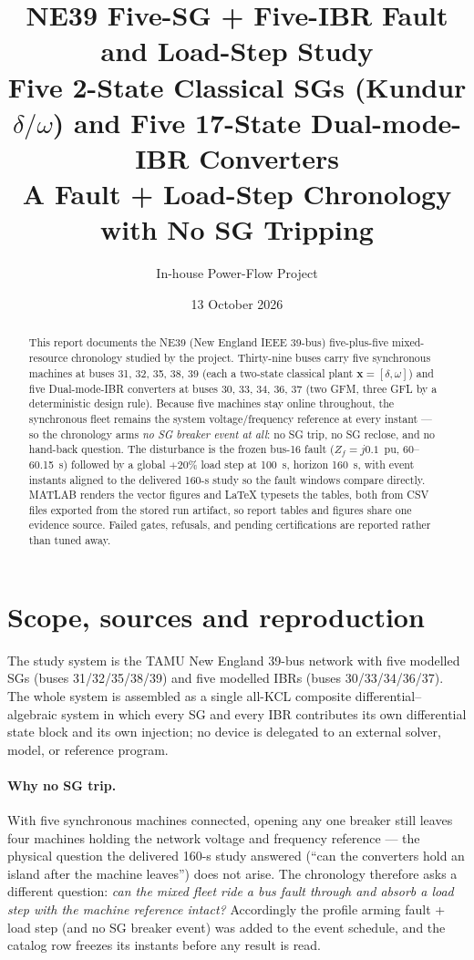 \documentclass[12pt,a4paper]{article}
\title{\textbf{NE39 Five-SG + Five-IBR Fault and Load-Step Study}\\
\large Five 2-State Classical SGs (Kundur $\delta/\omega$) and Five 17-State Dual-mode-IBR Converters\\[1mm]
\normalsize A Fault + Load-Step Chronology with No SG Tripping}
\author{In-house Power-Flow Project}
\date{13 October 2026}
\newcommand{\vect}[1]{\boldsymbol{#1}}
\newcommand{\code}[1]{\texttt{\detokenize{#1}}}
\begin{document}
\maketitle

\begin{abstract}
This report documents the NE39 (New England IEEE 39-bus) five-plus-five mixed-resource
chronology studied by the project.  Thirty-nine buses carry five synchronous machines
at buses 31, 32, 35, 38, 39 (each a two-state classical plant $\vect x=[\delta,\omega]$)
and five Dual-mode-IBR converters at buses 30, 33, 34, 36, 37 (two GFM, three GFL by a
deterministic design rule).
Because five machines stay online throughout, the synchronous fleet remains the
system voltage/frequency reference at every instant --- so the chronology arms
\emph{no SG breaker event at all}: no SG trip, no SG reclose, and no hand-back
question.  The disturbance is the frozen bus-16 fault ($Z_f=j0.1$~pu,
60--60.15~s) followed by a global $+20\%$ load step at 100~s, horizon 160~s, with
event instants aligned to the delivered 160-s study so the fault windows compare
directly.  MATLAB renders the vector figures and \LaTeX{} typesets the tables, both from
CSV files exported from the stored run artifact, so report tables and figures
share one evidence source.  Failed gates,
refusals, and pending certifications are reported rather than tuned away.
\end{abstract}

\newpage
\tableofcontents
\newpage

\section{Scope, sources and reproduction}\label{sec:scope}

The study system is the TAMU New England 39-bus network with five modelled SGs
(buses 31/32/35/38/39) and five modelled IBRs (buses 30/33/34/36/37).  The whole
system is assembled as a single all-KCL composite differential--algebraic system in
which every SG and every IBR contributes its own differential state block and its own
injection; no device is delegated to an external solver, model, or reference program.

\paragraph{Why no SG trip.}
With five synchronous machines connected, opening any one breaker still leaves four
machines holding the network voltage and frequency reference --- the physical
question the delivered 160-s study answered (``can the converters hold an island
after the machine leaves'') does not arise.  The chronology therefore asks a
different question: \emph{can the mixed fleet ride a bus fault through and absorb a
load step with the machine reference intact?}  Accordingly the profile
\code{fault_load_step} arming fault + load step (and no SG breaker event) was added
to the event schedule, and the catalog row \code{fault_load_step20} freezes its
instants before any result is read.
\end{document}

